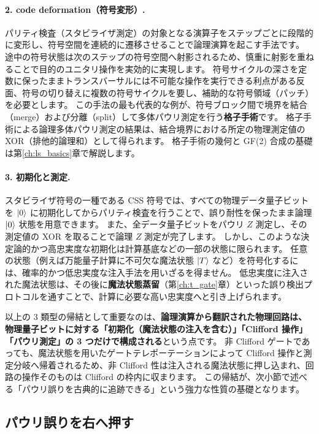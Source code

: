\paragraph{2. code deformation（符号変形）.}
パリティ検査（スタビライザ測定）の対象となる演算子をステップごとに段階的に変形し、符号空間を連続的に遷移させることで論理演算を起こす手法です。
途中の符号状態は次のステップの符号空間へ射影されるため、慎重に射影を重ねることで目的のユニタリ操作を実効的に実現します。
符号サイクルの深さを定数に保ったままトランスバーサルには不可能な操作を実行できる利点がある反面、符号の切り替えに複数の符号サイクルを要し、補助的な符号領域（パッチ）を必要とします。
この手法の最も代表的な例が、符号ブロック間で境界を結合（merge）および分離（split）して多体パウリ測定を行う\textbf{格子手術}です。
格子手術による論理多体パウリ測定の結果は、結合境界における所定の物理測定値の XOR（排他的論理和）として得られます。
格子手術の幾何と GF(2) 合成の基礎は第\ref{ch:ls_basics}章で解説します。

\paragraph{3. 初期化と測定.}
スタビライザ符号の一種である CSS 符号では、すべての物理データ量子ビットを $\ket{0}$ に初期化してからパリティ検査を行うことで、誤り耐性を保ったまま論理 $\ket{0}$ 状態を用意できます。
また、全データ量子ビットをパウリ $Z$ 測定し、その測定値の XOR を取ることで論理 $Z$ 測定が完了します。
しかし、このような決定論的かつ高忠実度な初期化は計算基底などの一部の状態に限られます。
任意の状態（例えば万能量子計算に不可欠な魔法状態 $\ket{T}$ など）を符号化するには、確率的かつ低忠実度な注入手法\cite{li2015magic}を用いざるを得ません。
低忠実度に注入された魔法状態は、その後に\textbf{魔法状態蒸留}（第\ref{ch:t_gate}章）といった誤り検出プロトコルを通すことで、計算に必要な高い忠実度へと引き上げられます。

以上の 3 類型の帰結として重要なのは、\textbf{論理演算から翻訳された物理回路は、物理量子ビットに対する「初期化（魔法状態の注入を含む）」「Clifford 操作」「パウリ測定」の 3 つだけで構成される}という点です。
非 Clifford ゲートであっても、魔法状態を用いたゲートテレポーテーションによって Clifford 操作と測定分岐へ帰着されるため、非 Clifford 性は注入される魔法状態に押し込まれ、回路の操作そのものは Clifford の枠内に収まります。
この帰結が、次小節で述べる「パウリ誤りを古典的に追跡できる」という強力な性質の基礎となります。

\subsection{パウリ誤りを右へ押す}

